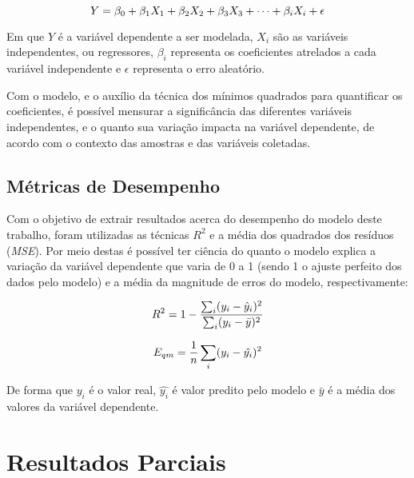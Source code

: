 \documentclass[english, spanish, brazilian]{RBIEarticle} %
\begin{document}
\vspace{0.5cm}
\begin{equation}
\large Y = \beta_0 + \beta_1X_1 + \beta_2X_2 + \beta_3X_3 + \cdots + \beta_iX_i + \epsilon 
\end{equation}
\vspace{0.5cm}

Em que $Y$ é a variável dependente a ser modelada, $X_i$ são as variáveis independentes, ou regressores, $\beta_i$ representa os coeficientes atrelados a cada variável independente e $\epsilon$ representa o erro aleatório. 

Com o modelo, e o auxílio da técnica dos mínimos quadrados para quantificar os coeficientes, é possível mensurar a significância das diferentes variáveis independentes, e o quanto sua variação impacta na variável dependente, de acordo com o contexto das amostras e das variáveis coletadas.



\subsection{Métricas de Desempenho}
Com o objetivo de extrair resultados acerca do desempenho do modelo deste trabalho, foram utilizadas as técnicas $R^2$ e a média dos quadrados dos resíduos (\textit{MSE}). Por meio destas é possível ter ciência do quanto o modelo explica a variação da variável dependente que varia de 0 a 1 (sendo 1 o ajuste perfeito dos dados pelo modelo) e a média da magnitude de erros do modelo, respectivamente:

\vspace{0.5cm}
\begin{equation}
\large R^2 = 1 - \frac{\sum_i(y_i-\hat{y}_i)^2}{\sum_i(y_i-\bar{y})^2}
\end{equation}
\vspace{0.5cm}

\vspace{0.5cm}
\begin{equation}
\large E_{qm} = \frac{1}{n} \sum_i(y_i-\hat{y_i})^2
\end{equation}
\vspace{0.5cm}

De forma que $y_i$ é o valor real, $\hat{y_i}$ é valor predito pelo modelo e $\bar{y}$ é a média dos valores da variável dependente.

\section{Resultados Parciais}
\end{document}
